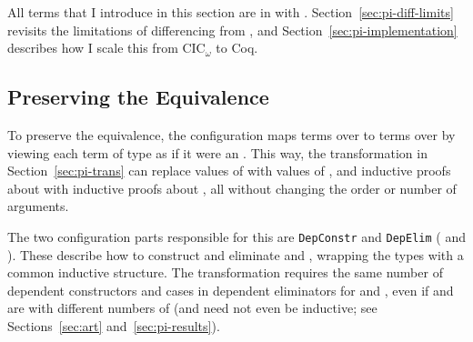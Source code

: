 All terms that I introduce in this section are in  with . %
Section~\ref{sec:pi-diff-limits} revisits the limitations of differencing from \sysname, 
and Section~\ref{sec:pi-implementation} describes how I scale this from CIC$_{\omega}$ to Coq.

\subsection{Preserving the Equivalence}
\label{sec:pi-diff-equiv}

To preserve the equivalence, the configuration maps terms over \Aa to terms over \B by viewing each
term of type \B as if it were an \Aa.
This way, the transformation in Section~\ref{sec:pi-trans} can replace values of \Aa with values of \B, and
inductive proofs about \Aa with inductive proofs about \B, %
all without changing the order or number of arguments.

The two configuration parts responsible for this are \lstinline{DepConstr}
and \lstinline{DepElim} ( and ).
These describe how to construct and eliminate \Aa and \B, wrapping the types with a common inductive structure.
The transformation requires the same number of dependent constructors and cases in dependent eliminators for \Aa and \B,
even if \Aa and \B are  with different numbers of 
(\Aa and \B need not even be inductive; see Sections~\ref{sec:art} and~\ref{sec:pi-results}).

